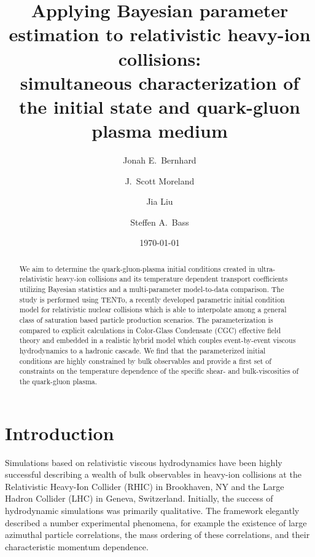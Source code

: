 \documentclass[aps,prc,reprint,amsmath,nofootinbib,superscriptaddress]{revtex4-1}
\newcommand{\trento}{T\raisebox{-0.5ex}{R}ENTo}
\begin{document}
\title{
  Applying Bayesian parameter estimation to relativistic heavy-ion collisions: \\
  simultaneous characterization of the initial state and quark-gluon plasma medium
}

\author{Jonah E.\ Bernhard}
\author{J.\ Scott Moreland}

\author{Jia Liu}

\author{Steffen A.\ Bass}

\date{\today}

\begin{abstract}
We aim to determine the quark-gluon-plasma initial conditions created in ultra-relativistic heavy-ion collisions and its temperature dependent transport coefficients utilizing Bayesian statistics and a multi-parameter model-to-data comparison.
The study is performed using \trento, a recently developed parametric initial condition model for relativistic nuclear collisions which is able to interpolate among a general class of saturation based particle production scenarios.
The parameterization is compared to explicit calculations in Color-Glass Condensate (CGC) effective field theory and embedded in a realistic hybrid model which couples event-by-event viscous hydrodynamics to a hadronic cascade.
We find that the parameterized initial conditions are highly constrained by bulk observables and provide a first set of constraints on the temperature dependence of the specific shear- and bulk-viscosities of the quark-gluon plasma.
\end{abstract}

\maketitle


\section{Introduction}

Simulations based on relativistic viscous hydrodynamics have been highly successful describing a wealth of bulk observables in heavy-ion collisions at the Relativistic Heavy-Ion Collider (RHIC) in Brookhaven, NY and the Large Hadron Collider (LHC) in Geneva, Switzerland.
Initially, the success of hydrodynamic simulations was primarily qualitative.
The framework elegantly described a number experimental phenomena, for example the existence of large azimuthal particle correlations, the mass ordering of these correlations, and their characteristic momentum dependence.
\end{document}
